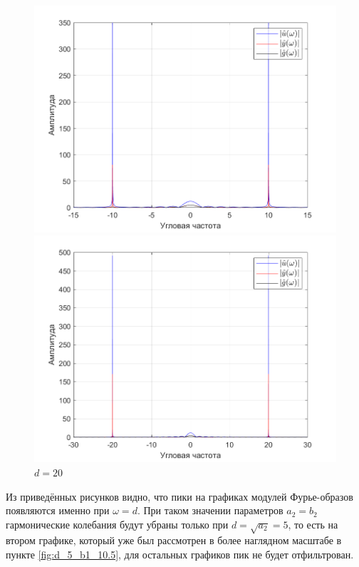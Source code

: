\documentclass[a4paper]{article}
\begin{document}
\begin{figure}[H]
    \begin{minipage}{0.5\textwidth}
        \centering
        \includegraphics[width=\linewidth]{ex1_2/a1=0_a2=25_b1=10.5_b2=25_d=10/h4.png}
        \caption{$d=10$}
    \end{minipage}
    \begin{minipage}{0.5\textwidth}
        \centering
        \includegraphics[width=\linewidth]{ex1_2/a1=0_a2=25_b1=10.5_b2=25_d=20/h4.png}
        \caption{$d=20$}
    \end{minipage}
\end{figure}

Из приведённых рисунков видно, что пики на графиках модулей Фурье-образов появляются именно при $\omega = d$. При таком значении параметров $a_2 = b_2$ гармонические колебания будут убраны только при $d = \sqrt{a_2} = 5$, то есть на втором графике, который уже был рассмотрен в более наглядном масштабе в пункте \ref{fig:d_5_b1_10.5}, для остальных графиков пик не будет отфильтрован.
\end{document}
